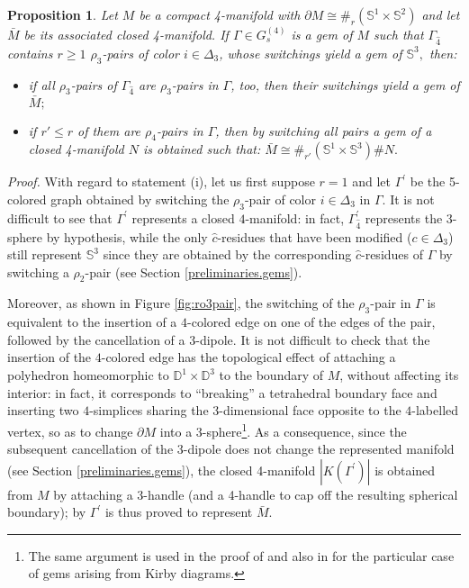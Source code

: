\documentclass[12pt,a4paper]{article}
\newtheorem{proposition}[lemma]{Proposition}
\newcommand{\dimo}{\noindent \emph{Proof. }}
\newcommand{\G}{\Gamma}
\begin{document}
\begin{proposition}\label{chiudere} Let $M$ be a compact 4-manifold with $\partial M\cong\#_r(\mathbb S^1\times\mathbb S^2)$ and let $\bar M$ be its associated closed 4-manifold. If $\G\in G_s^{(4)}$ is a gem of $M$ such that $\G_{\hat 4}$ contains $r\geq 1$ $\rho_3$-pairs of color $i\in\Delta_3$, whose switchings yield a gem of $\mathbb S^3,$ then:
\begin{itemize}
\item [(i)] if all $\rho_3$-pairs of $\G_{\hat 4}$ are $\rho_3$-pairs in $\G$, too, then their switchings yield a gem of $\bar M;$
\item [(ii)] if $r'\leq r$ of them are $\rho_4$-pairs in $\G$, then by switching all pairs a gem  of a closed 4-manifold $N$ is obtained such that:
$\bar M\cong\#_{r'}(\mathbb S^1\times\mathbb S^3)\# N.$
\end{itemize}
\end{proposition} 


\dimo 
With regard to statement (i), let us first suppose $r=1$ and let $\Gamma^\prime$ be the 5-colored graph obtained by switching the $\rho_3$-pair of color $i\in\Delta_3$ in $\G$. 
It is not difficult to see that $\Gamma^\prime$ represents a closed $4$-manifold: in fact, $\G^\prime_{\hat 4}$ represents the 3-sphere by hypothesis, while the only ${\hat c}$-residues that have been modified ($c\in\Delta_3$) still represent $\mathbb S^3$ since they are obtained by the corresponding ${\hat c}$-residues of $\G$ by switching a $\rho_2$-pair (see Section \ref{preliminaries.gems}).

Moreover, as shown in Figure \ref{fig:ro3pair}, the switching of the $\rho_3$-pair in $\G$ is equivalent to the insertion of a $4$-colored edge on one of the edges of the pair, followed by the cancellation of a $3$-dipole. 
It is not difficult to check that the insertion of the $4$-colored edge has the topological effect of attaching a polyhedron homeomorphic to $\mathbb D^1\times\mathbb D^3$ to the boundary of $M$, without affecting its interior: in fact, it corresponds to  ``breaking'' a tetrahedral boundary face and inserting two $4$-simplices sharing the $3$-dimensional face opposite to the $4$-labelled vertex, so as to change $\partial M$ into a $3$-sphere\footnote{The same argument is used in the proof of \cite[Proposition 4.3]{Casali-Cristofori trisection bis} and also in \cite[Proposition 11(ii)]{Casali-Cristofori Kirby-diagrams} for the particular case of gems arising from Kirby diagrams.}.
As a consequence, since the subsequent cancellation of the 3-dipole does not change the represented manifold (see Section \ref{preliminaries.gems}), the closed 4-manifold $|K(\G^\prime)|$ is obtained from $M$ by attaching a 3-handle (and a 4-handle to cap off the resulting spherical boundary); by \cite{Laudenbach-Poenaru} $\G^\prime$ is thus proved to represent $\bar M.$
\end{document}
